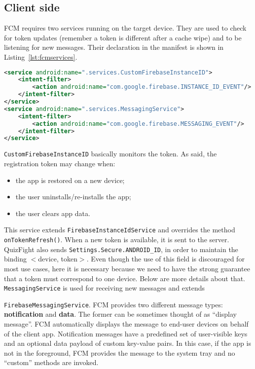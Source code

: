 \subsection{Client side}
FCM requires two services running on the target device.
They are used to check for token updates (remember a token is different after
a cache wipe) and to be listening for new messages.
Their declaration in the manifest is shown in Listing~\ref{lst:fcmservices}.

\begin{lstlisting}[language=xml, caption={FCM Services}, label={lst:fcmservices}]
<service android:name=".services.CustomFirebaseInstanceID">
	<intent-filter>
		<action android:name="com.google.firebase.INSTANCE_ID_EVENT"/>
	</intent-filter>
</service>
<service android:name=".services.MessagingService">
	<intent-filter>
		<action android:name="com.google.firebase.MESSAGING_EVENT"/>
	</intent-filter>
</service>
\end{lstlisting}

\texttt{CustomFirebaseInstanceID} basically monitors the token.
As said, the registration token may change when:

\begin{itemize}
	\item the app is restored on a new device;
	\item the user uninstalls/re-installs the app;
	\item the user clears app data.
\end{itemize}

This service extends \texttt{FirebaseInstanceIdService} and overrides the
method \texttt{onTokenRefresh()}.
When a new token is available, it is sent to the server.
QuizFight also sends \texttt{Settings.Secure.ANDROID\_ID}, in order to
maintain the binding $<$device, token$>$. Even though the use of this field is
discouraged for most use cases, here it is necessary because we need to have
the strong guarantee that a token must correspond to one device.
Below are more details about that. \\

\texttt{MessagingService} is used for receiving new messages and extends 

\texttt{FirebaseMessagingService}. FCM provides two different message types:
\textbf{notification} and \textbf{data}.
The former can be sometimes thought of as ``display message''.
FCM automatically displays the message to end-user devices on behalf of the
client app.
Notification messages have a predefined set of user-visible keys and an
optional data payload of custom key-value pairs.
In this case, if the app is not in the foreground, FCM provides the message to
the system tray and no ``custom'' methods are invoked.

